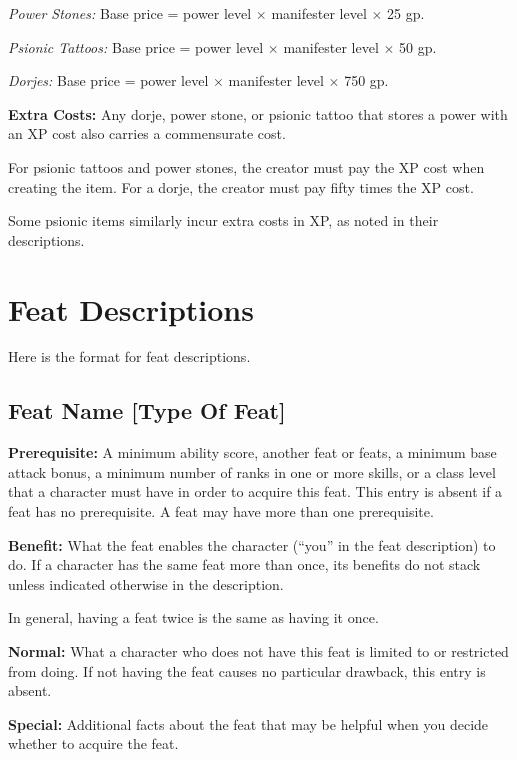 \textit{Power Stones:} Base price = power level $\times$ manifester level $\times$ 25 gp.

\textit{Psionic Tattoos:} Base price = power level $\times$ manifester level $\times$ 50 gp.

\textit{Dorjes:} Base price = power level $\times$ manifester level $\times$ 750 gp.

\textbf{Extra Costs:} Any dorje, power stone, or psionic tattoo that stores a power with an XP cost also carries a commensurate cost.

For psionic tattoos and power stones, the creator must pay the XP cost when creating the item. For a dorje, the creator must pay fifty times the XP cost.

Some psionic items similarly incur extra costs in XP, as noted in their descriptions.


\section{Feat Descriptions}
Here is the format for feat descriptions.

\subsection{Feat Name {\normalsize[Type Of Feat]}}
\textbf{Prerequisite:} A minimum ability score, another feat or feats, a minimum base attack bonus, a minimum number of ranks in one or more skills, or a class level that a character must have in order to acquire this feat. This entry is absent if a feat has no prerequisite. A feat may have more than one prerequisite.

\textbf{Benefit:} What the feat enables the character (``you'' in the feat description) to do. If a character has the same feat more than once, its benefits do not stack unless indicated otherwise in the description.

In general, having a feat twice is the same as having it once.

\textbf{Normal:} What a character who does not have this feat is limited to or restricted from doing. If not having the feat causes no particular drawback, this entry is absent.

\textbf{Special:} Additional facts about the feat that may be helpful when you decide whether to acquire the feat.
















